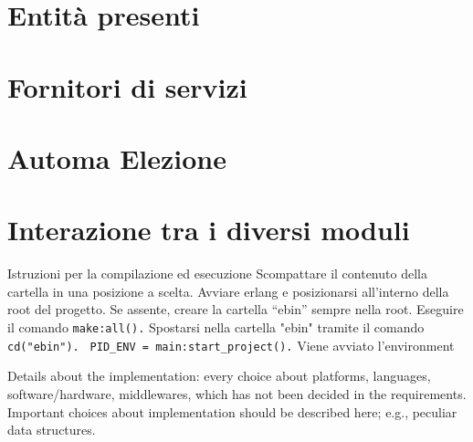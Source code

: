 \section{Entità presenti}

\section{Fornitori di servizi}

\section{Automa Elezione}

\section{Interazione tra i diversi moduli}


Istruzioni per la compilazione ed esecuzione
Scompattare il contenuto della cartella in una posizione a scelta. 
Avviare erlang e posizionarsi all'interno della root del progetto. 
Se assente, creare la cartella ``ebin'' sempre nella root.
Eseguire il comando
\lstinline|make:all().|
Spostarsi nella cartella "ebin" tramite il comando
\lstinline|cd("ebin").|
\lstinline| PID_ENV = main:start_project().|
Viene avviato l'environment 



Details about the implementation: every choice about platforms, languages, software/hardware, middlewares, which has not been decided in the requirements.
Important choices about implementation should be described here; e.g., peculiar data structures.
